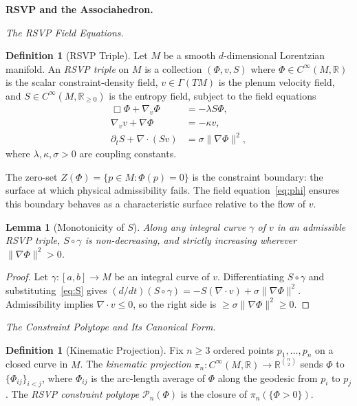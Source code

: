 \documentclass[12pt, oneside]{amsart}
\theoremstyle{plain}
\newtheorem{lemma}[theorem]{Lemma}
\theoremstyle{definition}
\newtheorem{definition}[theorem]{Definition}
\theoremstyle{remark}
\newcommand{\R}{\mathbb{R}}
\newcommand{\Phif}{\Phi}
\newcommand{\vf}{v}
\newcommand{\Sf}{S}
\begin{document}
\bigskip\noindent\textbf{RSVP and the Associahedron.}
\label{sec:rsvp}

\medskip\noindent\textit{The RSVP Field Equations.}

\begin{definition}[RSVP Triple]
Let $M$ be a smooth $d$-dimensional Lorentzian manifold. An \emph{RSVP triple} on $M$ is a collection $(\Phif, \vf, \Sf)$ where $\Phif \in C^\infty(M, \R)$ is the scalar constraint-density field, $\vf \in \Gamma(TM)$ is the plenum velocity field, and $\Sf \in C^\infty(M, \R_{\geq 0})$ is the entropy field, subject to the field equations
\begin{align}
  \Box \Phif + \nabla_\vf \Phif &= -\lambda \Sf \Phif, \label{eq:phi}\\
  \nabla_\vf \vf + \nabla \Phif &= -\kappa \vf, \label{eq:v}\\
  \partial_t \Sf + \nabla \cdot (\Sf \vf) &= \sigma \|\nabla \Phif\|^2, \label{eq:S}
\end{align}
where $\lambda, \kappa, \sigma > 0$ are coupling constants.
\end{definition}

The zero-set $Z(\Phif) = \{p \in M : \Phif(p) = 0\}$ is the constraint boundary: the surface at which physical admissibility fails. The field equation~\eqref{eq:phi} ensures this boundary behaves as a characteristic surface relative to the flow of $\vf$.

\begin{lemma}[Monotonicity of $\Sf$]
\label{lem:S-monotone}
Along any integral curve $\gamma$ of $\vf$ in an admissible RSVP triple, $\Sf \circ \gamma$ is non-decreasing, and strictly increasing wherever $\|\nabla\Phif\|^2 > 0$.
\end{lemma}

\begin{proof}
Let $\gamma: [a,b] \to M$ be an integral curve of $\vf$. Differentiating $\Sf \circ \gamma$ and substituting~\eqref{eq:S} gives $(d/dt)(\Sf \circ \gamma) = -\Sf(\nabla \cdot \vf) + \sigma\|\nabla\Phif\|^2$. Admissibility implies $\nabla \cdot \vf \leq 0$, so the right side is $\geq \sigma\|\nabla\Phif\|^2 \geq 0$.
\end{proof}

\medskip\noindent\textit{The Constraint Polytope and Its Canonical Form.}

\begin{definition}[Kinematic Projection]
Fix $n \geq 3$ ordered points $p_1, \ldots, p_n$ on a closed curve in $M$. The \emph{kinematic projection} $\pi_n: C^\infty(M,\R) \to \R^{\binom{n}{2}}$ sends $\Phif$ to $\{\Phif_{ij}\}_{i < j}$, where $\Phif_{ij}$ is the arc-length average of $\Phif$ along the geodesic from $p_i$ to $p_j$. The \emph{RSVP constraint polytope} $\mathcal{P}_n(\Phif)$ is the closure of $\pi_n(\{\Phif > 0\})$.
\end{definition}
\end{document}
